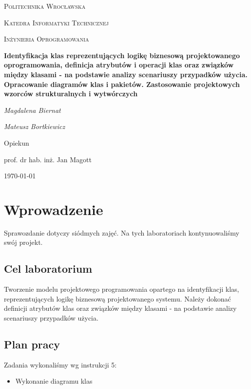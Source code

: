 \documentclass{article}
\begin{document}
	
	\begin{titlepage}
		\centering
		{\scshape\LARGE Politechnika Wrocławska \par}
		{\scshape\Large Katedra Informatyki Technicznej\par}
		
		\vspace{1cm}
		{\scshape\Large Inżynieria Oprogramowania\par}
		\vspace{1.5cm}
		{\huge\bfseries Identyfikacja klas reprezentujących logikę biznesową projektowanego oprogramowania, definicja atrybutów i 	operacji klas oraz związków między klasami - na podstawie
			analizy scenariuszy przypadków użycia. Opracowanie
			diagramów klas i pakietów. Zastosowanie projektowych
			wzorców strukturalnych i wytwórczych\par}
		\vspace{2cm}
		{\Large\itshape Magdalena Biernat\par}
		{\Large\itshape Mateusz Bortkiewicz\par}
		\vfill
		Opiekun\par
		prof. dr hab. inż. Jan Magott 
		
		\vfill
		{\large \today\par}
	\end{titlepage}
	\newpage
	
	\section{Wprowadzenie}
	Sprawozdanie dotyczy siódmych zajęć. Na tych laboratoriach kontynuowaliśmy swój projekt. 
	
	\subsection{Cel laboratorium}
Tworzenie modelu projektowego programowania opartego na
identyfikacji klas, reprezentujących logikę biznesową projektowanego systemu. Należy dokonać definicji atrybutów klas oraz związków między klasami - na podstawie analizy scenariuszy przypadków użycia.
	
	\subsection{Plan pracy}
	Zadania wykonaliśmy wg instrukcji 5:
	
	\begin{itemize}
		\item Wykonanie diagramu klas
	\end{itemize}
	\newpage
\end{document}
